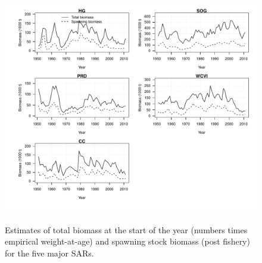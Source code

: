 \begin{figure}[!tbp]
	\includegraphics[width=\textwidth]{../FIGS/qPriorFigs/iscam_fig_biomass.pdf}\\
	\caption{Estimates of total biomass at the start of the year (numbers times empirical weight-at-age) and spawning stock biomass (post fishery) for the five major SARs.}\label{PartII:Results:figBiomass}
\end{figure}


